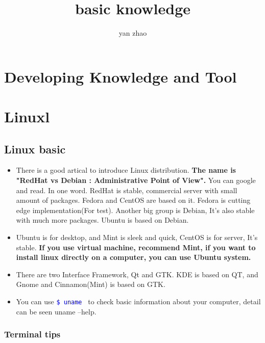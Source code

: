 \documentclass[a4paper,12pt,twoside]{book}
\newcommand{\linuxcommand}[1]{\texttt{\textcolor{blue}{\$ #1 \Pisymbol{psy}{191}}}}
\begin{document}
\title{basic knowledge}
\author{yan zhao}
\date{}\maketitle

\else
\chapter{Developing Knowledge and Tool}
\fi

\chapter{Linuxl}
\section{Linux basic}
\begin{itemize}
		\item There is a good artical to introduce Linux distribution. \textbf{The name is "RedHat vs Debian : Administrative Point of View".} You can google and read. In one word. RedHat is stable, commercial server with small amount of packages. Fedora and CentOS are based on it. Fedora is cutting edge implementation(For test). Another big group is Debian, It's also stable with much more packages. Ubuntu is based on Debian.

		\item Ubuntu is for desktop, and Mint is sleek and quick, CentOS is for server, It's stable. \textbf{If you use virtual machine, recommend Mint, if you want to install linux directly on a computer, you can use Ubuntu system.}

\item There are two Interface Framework, Qt and GTK\@.  KDE is based on QT, and Gnome and Cinnamon(Mint) is based on GTK.  

\item You can use \linuxcommand{uname} to check basic information about your computer, detail can be seen uname --help. 
\end{itemize}
\subsection{Terminal tips}
\end{document}
